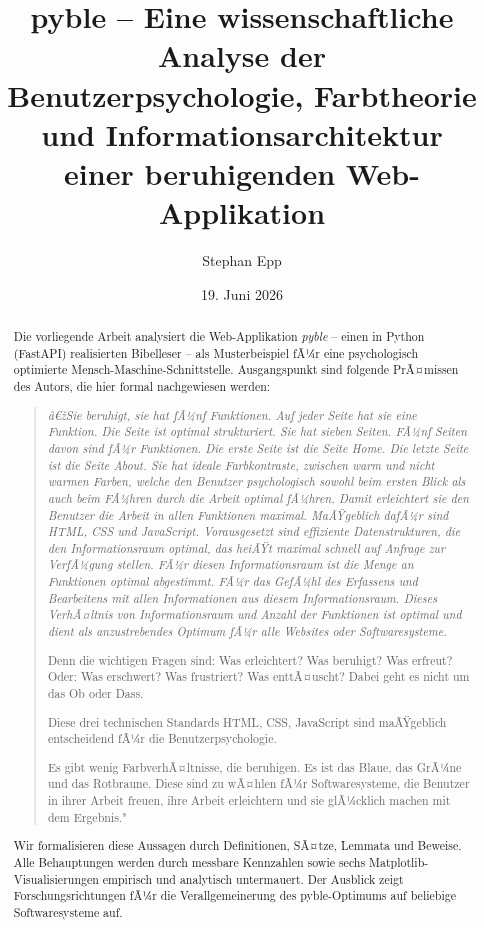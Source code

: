 ﻿\documentclass[a4paper,12pt]{article}
\title{\textbf{pyble} -- Eine wissenschaftliche Analyse der\\
Benutzerpsychologie, Farbtheorie und Informationsarchitektur\\
einer beruhigenden Web-Applikation}
\author{Stephan Epp}
\date{19. Juni 2026}
\theoremstyle{definition}
\begin{document}
\sloppy
\renewcommand{\abstractname}{Kurzfassung}
\renewcommand{\contentsname}{Inhaltsverzeichnis}
\renewcommand{\figurename}{Abbildung}
\renewcommand{\tablename}{Tabelle}
\renewcommand{\refname}{Literaturverzeichnis}

\begin{abstract}
Die vorliegende Arbeit analysiert die Web-Applikation \textit{pyble} -- einen in Python
(FastAPI) realisierten Bibelleser -- als Musterbeispiel fÃ¼r eine psychologisch optimierte
Mensch-Maschine-Schnittstelle. Ausgangspunkt sind folgende PrÃ¤missen des Autors, die
hier formal nachgewiesen werden:

\begin{quote}
\itshape
â€žSie beruhigt, sie hat fÃ¼nf Funktionen. Auf jeder Seite hat sie eine Funktion. Die Seite
ist optimal strukturiert. Sie hat sieben Seiten. FÃ¼nf Seiten davon sind fÃ¼r Funktionen. Die
erste Seite ist die Seite Home. Die letzte Seite ist die Seite About. Sie hat ideale
Farbkontraste, zwischen warm und nicht warmen Farben, welche den Benutzer psychologisch
sowohl beim ersten Blick als auch beim FÃ¼hren durch die Arbeit optimal fÃ¼hren. Damit
erleichtert sie den Benutzer die Arbeit in allen Funktionen maximal. MaÃŸgeblich dafÃ¼r sind
HTML, CSS und JavaScript. Vorausgesetzt sind effiziente Datenstrukturen, die den
Informationsraum optimal, das heiÃŸt maximal schnell auf Anfrage zur VerfÃ¼gung stellen.
FÃ¼r diesen Informationsraum ist die Menge an Funktionen optimal abgestimmt. FÃ¼r das
GefÃ¼hl des Erfassens und Bearbeitens mit allen Informationen aus diesem Informationsraum.
Dieses VerhÃ¤ltnis von Informationsraum und Anzahl der Funktionen ist optimal und dient als
anzustrebendes Optimum fÃ¼r alle Websites oder Softwaresysteme.

Denn die wichtigen Fragen sind: Was erleichtert? Was beruhigt? Was erfreut? Oder: Was
erschwert? Was frustriert? Was enttÃ¤uscht? Dabei geht es nicht um das Ob oder Dass.

Diese drei technischen Standards HTML, CSS, JavaScript sind maÃŸgeblich entscheidend fÃ¼r
die Benutzerpsychologie.

Es gibt wenig FarbverhÃ¤ltnisse, die beruhigen. Es ist das Blaue, das GrÃ¼ne und das
Rotbraune. Diese sind zu wÃ¤hlen fÃ¼r Softwaresysteme, die Benutzer in ihrer Arbeit freuen,
ihre Arbeit erleichtern und sie glÃ¼cklich machen mit dem Ergebnis."
\end{quote}

Wir formalisieren diese Aussagen durch Definitionen, SÃ¤tze, Lemmata und Beweise. Alle
Behauptungen werden durch messbare Kennzahlen sowie sechs Matplotlib-Visualisierungen
empirisch und analytisch untermauert. Der Ausblick zeigt Forschungsrichtungen fÃ¼r die
Verallgemeinerung des pyble-Optimums auf beliebige Softwaresysteme auf.
\end{abstract}
\end{document}
